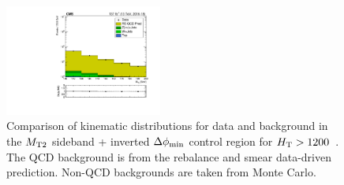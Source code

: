 \begin{figure}[!htbp]
\begin{center}
    \includegraphics[width=0.46\textwidth]{figs/qcd/rs_data/c_crRSDPhiMT2InclusiveHT1200toInf_h_mt2.pdf}
    \caption{Comparison of kinematic distributions for data and background in the $M_{\mathrm{T2}}$ sideband + inverted $\Delta\phi_{\mathrm{min}}$ control region for $H_{\mathrm{T}} > 1200$~\GeV. The QCD background is from the
             rebalance and smear data-driven prediction. Non-QCD backgrounds are taken from Monte Carlo.
            }
    \label{Fig:rs_crRSDPhiMT2InclusiveHT1200toInf}
  \end{center}
\end{figure}


